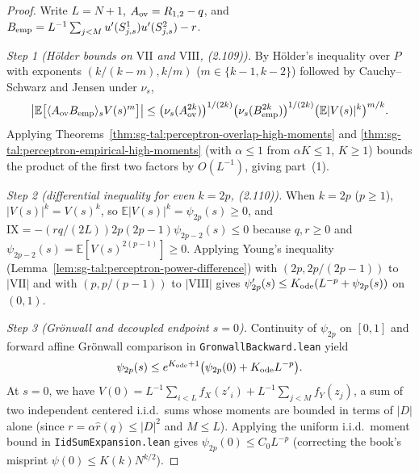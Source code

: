 \begin{proof}
  \leanok
Write $L=N+1$, $A_{\rm ov}=R_{1,2}-q$, and $B_{\rm emp}=L^{-1}\sum_{j<M}u'(S^1_{j,s})u'(S^2_{j,s})-r$.

\emph{Step 1 (H\"older bounds on $\mathrm{VII}$ and $\mathrm{VIII}$, (2.109)).} By H\"older's inequality over $P$
with exponents $(k/(k-m),k/m)$ ($m\in\{k-1,k-2\}$) followed by Cauchy--Schwarz and Jensen under $\nu_s$,
\[
 \bigl|\mathbb E\bigl[\langle A_{\rm ov}B_{\rm emp}\rangle_s V(s)^m\bigr]\bigr|
 \le\bigl(\nu_s(A_{\rm ov}^{2k})\bigr)^{1/(2k)}\bigl(\nu_s(B_{\rm emp}^{2k})\bigr)^{1/(2k)}
   \bigl(\mathbb E|V(s)|^k\bigr)^{m/k}.
\]
Applying Theorems~\ref{thm:sg-tal:perceptron-overlap-high-moments} and
\ref{thm:sg-tal:perceptron-empirical-high-moments} (with $\alpha\le 1$ from $\alpha K\le 1$, $K\ge 1$) bounds the
product of the first two factors by $O(L^{-1})$, giving part~(1).

\emph{Step 2 (differential inequality for even $k=2p$, (2.110)).} When $k=2p$ ($p\ge 1$), $|V(s)|^k=V(s)^k$, so
$\mathbb E|V(s)|^k=\psi_{2p}(s)\ge 0$, and $\mathrm{IX}=-(rq/(2L))2p(2p-1)\psi_{2p-2}(s)\le 0$ because
$q,r\ge 0$ and $\psi_{2p-2}(s)=\mathbb E[V(s)^{2(p-1)}]\ge 0$. Applying Young's inequality
(Lemma~\ref{lem:sg-tal:perceptron-power-difference}) with $(2p,2p/(2p-1))$ to $|\mathrm{VII}|$ and with
$(p,p/(p-1))$ to $|\mathrm{VIII}|$ gives $\psi'_{2p}(s)\le K_{\rm ode}(L^{-p}+\psi_{2p}(s))$ on $(0,1)$.

\emph{Step 3 (Gr\"onwall and decoupled endpoint $s=0$).} Continuity of $\psi_{2p}$ on $[0,1]$ and forward affine
Gr\"onwall comparison in \texttt{GronwallBackward.lean} yield
\[
 \psi_{2p}(s)\le e^{K_{\rm ode}+1}\bigl(\psi_{2p}(0)+K_{\rm ode}L^{-p}\bigr).
\]
At $s=0$, we have $V(0)=L^{-1}\sum_{i<L}f_X(z'_i)+L^{-1}\sum_{j<M}f_Y(z_j)$, a sum of two independent
centered i.i.d.\ sums whose moments are bounded in terms of $|D|$ alone (since
$r=\alpha\widehat r(q)\le|D|^2$ and $M\le L$). Applying the uniform i.i.d.\ moment bound in
\texttt{IidSumExpansion.lean} gives $\psi_{2p}(0)\le C_0 L^{-p}$ (correcting the book's misprint
$\psi(0)\le K(k)N^{k/2}$).


\end{proof}
